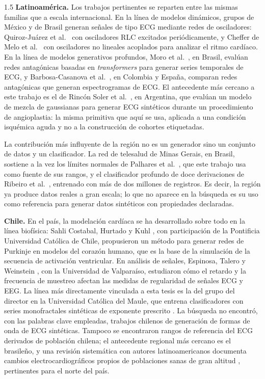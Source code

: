 \begin{spacing}{1.5}
\textbf{Latinoamérica.} Los trabajos pertinentes se reparten entre las mismas familias que a escala internacional. En la línea de modelos dinámicos, grupos de México y de Brasil generan señales de tipo ECG mediante redes de osciladores: Quiroz-Juárez et al.\ \cite{quirozjuarez2018rlc} con osciladores RLC excitados periódicamente, y Cheffer de Melo et al.\ \cite{chefferdemelo2021heart} con osciladores no lineales acoplados para analizar el ritmo cardíaco. En la línea de modelos generativos profundos, Moro et al.\ \cite{moro2025transformer}, en Brasil, evalúan redes antagónicas basadas en \emph{transformers} para generar series temporales de ECG, y Barbosa-Casanova et al.\ \cite{barbosacasanova2025spectrogram}, en Colombia y España, comparan redes antagónicas que generan espectrogramas de ECG. El antecedente más cercano a este trabajo es el de Rincón Soler et al.\ \cite{rinconsoler2022gmm}, en Argentina, que evalúan un modelo de mezcla de gaussianas para generar ECG sintéticos durante un procedimiento de angioplastia: la misma primitiva que aquí se usa, aplicada a una condición isquémica aguda y no a la construcción de cohortes etiquetadas.

La contribución más influyente de la región no es un generador sino un conjunto de datos y un clasificador. La red de telesalud de Minas Gerais, en Brasil, sostiene a la vez los límites normales de Palhares et al.\ \cite{palhares2017normal}, que este trabajo usa como fuente de sus rangos, y el clasificador profundo de doce derivaciones de Ribeiro et al.\ \cite{ribeiro2020automatic}, entrenado con más de dos millones de registros. Es decir, la región ya produce datos reales a gran escala; lo que no aparece en la búsqueda es su uso como referencia para generar datos sintéticos con propiedades declaradas.

\textbf{Chile.} En el país, la modelación cardíaca se ha desarrollado sobre todo en la línea biofísica: Sahli Costabal, Hurtado y Kuhl \cite{sahlicostabal2016purkinje}, con participación de la Pontificia Universidad Católica de Chile, propusieron un método para generar redes de Purkinje en modelos del corazón humano, que es la base de la simulación de la secuencia de activación ventricular. En análisis de señales, Espinosa, Talero y Weinstein \cite{espinosa2020entropy}, con la Universidad de Valparaíso, estudiaron cómo el retardo y la frecuencia de muestreo afectan las medidas de regularidad de señales ECG y EEG. La línea más directamente vinculada a esta tesis es la del grupo del director en la Universidad Católica del Maule, que entrena clasificadores con series monofractales sintéticas de exponente prescrito \cite{lopez2023congestive,lopez2024monofractal,lopez2025monofractal}. La búsqueda no encontró, con las palabras clave empleadas, trabajos chilenos de generación de formas de onda de ECG sintéticas. Tampoco se encontraron rangos de referencia del ECG derivados de población chilena; el antecedente regional más cercano es el brasileño, y una revisión sistemática con autores latinoamericanos documenta cambios electrocardiográficos propios de poblaciones sanas de gran altitud \cite{parodi2022altitude}, pertinentes para el norte del país.


\end{spacing}
